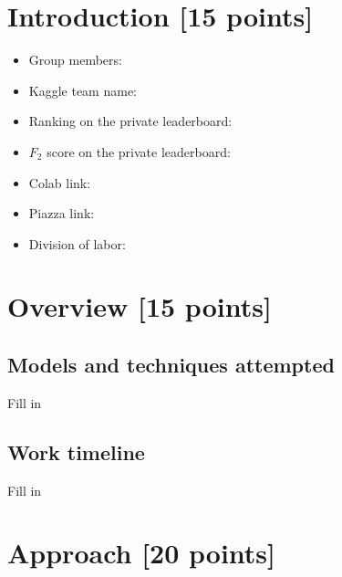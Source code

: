 \newif\ifshowsolutions
\showsolutionstrue







\pagestyle{fancy}




\newpage

\section{Introduction [15 points]}
    \begin{itemize}
        \item Group members:
        \item Kaggle team name:
        \item Ranking on the private leaderboard:
        \item $F_2$ score on the private leaderboard:
        \item Colab link:
        \item Piazza link:
        \item Division of labor:
    \end{itemize} 
\newpage

\section{Overview [15 points]}
\subsection{Models and techniques attempted}
Fill in

\subsection{Work timeline}
Fill in

\newpage

\section{Approach [20 points]}

